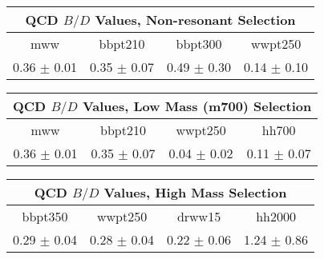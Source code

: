 \begin{tabular}{c|c|c|c}
\hline\hline
\multicolumn{4}{c}{QCD $B/D$ Values, Non-resonant Selection}\\\hline\hline
mww             & bbpt210               & bbpt300               & wwpt250          \\\hline
0.36 $\pm$ 0.01 	& 0.35 $\pm$ 0.07 	& 0.49 $\pm$ 0.30 	& 0.14 $\pm$ 0.10  \\\hline 

\hline\hline
\end{tabular}

\begin{tabular}{c|c|c|c}
\multicolumn{4}{c}{QCD $B/D$ Values, Low Mass (m700) Selection}\\\hline\hline
mww                     & bbpt210               & wwpt250               & hh700            \\\hline
0.36 $\pm$ 0.01 	& 0.35 $\pm$ 0.07 	& 0.04 $\pm$ 0.02 	& 0.11 $\pm$ 0.07  \\\hline 

\hline\hline
\end{tabular}

\begin{tabular}{c|c|c|c}
\multicolumn{4}{c}{QCD $B/D$ Values, High Mass Selection}\\\hline\hline
bbpt350                 & wwpt250               & drww15                & hh2000            \\\hline
0.29 $\pm$ 0.04 	& 0.28 $\pm$ 0.04 	& 0.22 $\pm$ 0.06 	& 1.24 $\pm$ 0.86	\\\hline 
\hline\hline
\end{tabular}

